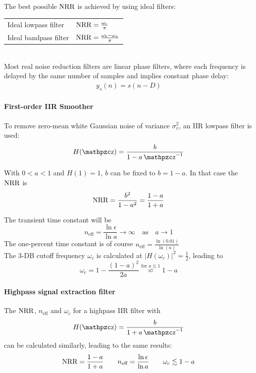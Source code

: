 The best possible $\operatorname{\text{NRR}}$ is achieved by using ideal filters:

\begin{tabularx}{\linewidth}{lX}
	Ideal lowpass filter & $\operatorname{\text{NRR}} = \frac{\omega_c}{\pi}$ \\
	Ideal bandpass filter & $\operatorname{\text{NRR}} = \frac{\omega_b - \omega_a}{\pi}$ \\
\end{tabularx} \\

Most real noise reduction filters are linear phase filters, where each frequency is delayed by the same number of samples and implies constant phase delay:
\begin{align*}
  y_s(n) = s(n-D)
\end{align*}

\paragraph{First-order IIR Smoother}
To remove zero-mean white Gaussian noise of variance $\sigma_v^2$, an
IIR lowpass filter is used:
\begin{equation*}
	H(\z) = \frac{b}{1-a\z^{-1}}
\end{equation*}

With $0 < a < 1$ and $H(1)=1$, $b$ can be fixed to $b=1-a$. In that
case the $\operatorname{\text{NRR}}$ is
\begin{equation*}
	\operatorname{\text{NRR}} = \frac{b^2}{1-a^2} = \frac{1-a}{1+a}
\end{equation*}

The transient time constant will be
\begin{equation*}
	n_{\text{eff}} = \frac{\ln \epsilon}{\ln a} \to \infty \quad \text{as} \quad a \to 1
\end{equation*}
The one-percent time constant is of course
 $n_{\text{eff}}=\frac{\ln(0.01)}{\ln(a)}$ \\

The 3-DB cutoff frequency $\omega_c$ is calculated at
$\left| H(\omega_c) \right|^2 = \frac{1}{2}$, leading to
\begin{equation*}
	\omega_c = 1 - \frac{(1-a)^2}{2 a} \stackrel{\text{for } a \lesssim 1}{\backsimeq} 1-a
\end{equation*}

\paragraph{Highpass signal extraction filter}
The $\operatorname{\text{NRR}}$, $n_{\text{eff}}$ and $\omega_c$ for a highpass IIR filter with
\begin{equation*}
	H(\z) = \frac{b}{1+a\z^{-1}}
\end{equation*}
can be calculated similarly, leading to the same results:
\begin{equation*}
	\operatorname{\text{NRR}} = \frac{1-a}{1+a} \qquad n_{\text{eff}} = \frac{\ln \epsilon}{\ln a} \qquad \omega_c \lesssim 1-a
\end{equation*}

